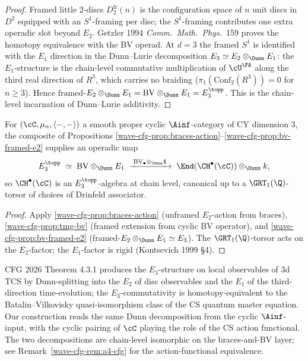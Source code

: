 \begin{proof}
Framed little $2$-discs $D^{\mathrm{fr}}_2(n)$ is the configuration
space of $n$ unit discs in $D^2$ equipped with an $S^1$-framing per
disc; the $S^1$-framing contributes one extra operadic slot beyond
$E_2$. Getzler 1994 \emph{Comm.\ Math.\ Phys.}\ 159 proves the homotopy
equivalence with the BV operad. At $d=3$ the framed $S^1$ is identified
with the $E_1$ direction in the Dunn--Lurie decomposition $E_3\simeq
E_2\otimes_\Dunn E_1$: the $E_1$-structure is the chain-level
commutative multiplication of $\cU^\FA$ along the third real direction
of $R^3$, which carries no braiding ($\pi_1(\mathrm{Conf}_2(R^3))=0$ for
$n\geq 3$). Hence $\mathrm{framed}$-$E_2\otimes_\Dunn E_1 =
\mathrm{BV}\otimes_\Dunn E_1 = E_3^\topp$. This is the chain-level
incarnation of Dunn--Lurie additivity. \end{proof}

\begin{theorem}[Menichi--Ginzburg--Dunn $E_3$-structure on $\CH^\bullet(\cC)$ at $d=3$]
\label{wave-cfg-thm:e3-on-hochschild}
For $(\cC,\mu_n,\langle-,-\rangle)$ a smooth proper cyclic
$\Ainf$-category of CY dimension $3$, the composite of Propositions
\ref{wave-cfg-prop:braces-action}--\ref{wave-cfg-prop:bv-framed-e2}
supplies an operadic map
\[
E_3^\topp\;\simeq\;\mathrm{BV}\otimes_\Dunn E_1
\;\xrightarrow{\;\mathrm{BV}_\bullet\otimes_\Dunn \mathbf 1\;}
\;\End(\CH^\bullet(\cC))\otimes_\Dunn k,
\]
so $\CH^\bullet(\cC)$ is an $E_3^\topp$-algebra at chain level,
canonical up to a $\GRT_1(\Q)$-torsor of choices of Drinfeld associator.
\end{theorem}

\begin{proof}
Apply \ref{wave-cfg-prop:braces-action} (unframed $E_2$-action from
braces), \ref{wave-cfg-prop:tmg-bv} (framed extension from cyclic
BV operator), and \ref{wave-cfg-prop:bv-framed-e2} (framed-$E_2
\otimes_\Dunn E_1 \simeq E_3$). The $\GRT_1(\Q)$-torsor acts on the
$E_2$-factor; the $E_1$-factor is rigid (Kontsevich 1999 \S 4).
\end{proof}

\begin{remark}
\label{wave-cfg-rem:a2-cfg}
CFG 2026 Theorem 4.3.1 produces the $E_3$-structure on local
observables of $3$d TCS by Dunn-splitting into the $E_2$ of disc
observables and the $E_1$ of the third-direction time-evolution; the
$E_3$-commutativity is homotopy-equivalent to the Batalin--Vilkovisky
quasi-isomorphism class of the CS quantum master equation. Our
construction reads the same Dunn decomposition from the cyclic
$\Ainf$-input, with the cyclic pairing of $\cC$ playing the role of
the CS action functional. The two decompositions are chain-level
isomorphic on the braces-and-BV layer; see
Remark~\ref{wave-cfg-rem:a4-cfg} for the action-functional equivalence.
\end{remark}

